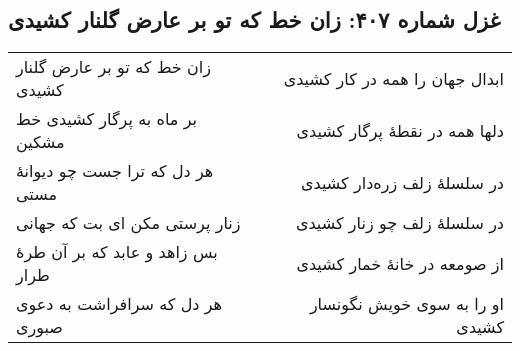 \begin{center}
\section*{غزل شماره ۴۰۷: زان خط که تو بر عارض گلنار کشیدی}
\label{sec:407}
\begin{longtable}{l p{0.5cm} r}
زان خط که تو بر عارض گلنار کشیدی
&&
ابدال جهان را همه در کار کشیدی
\\
بر ماه به پرگار کشیدی خط مشکین
&&
دلها همه در نقطهٔ پرگار کشیدی
\\
هر دل که ترا جست چو دیوانهٔ مستی
&&
در سلسلهٔ زلف زره‌دار کشیدی
\\
زنار پرستی مکن ای بت که جهانی
&&
در سلسلهٔ زلف چو زنار کشیدی
\\
بس زاهد و عابد که بر آن طرهٔ طرار
&&
از صومعه در خانهٔ خمار کشیدی
\\
هر دل که سرافراشت به دعوی صبوری
&&
او را به سوی خویش نگونسار کشیدی
\\
\end{longtable}
\end{center}
